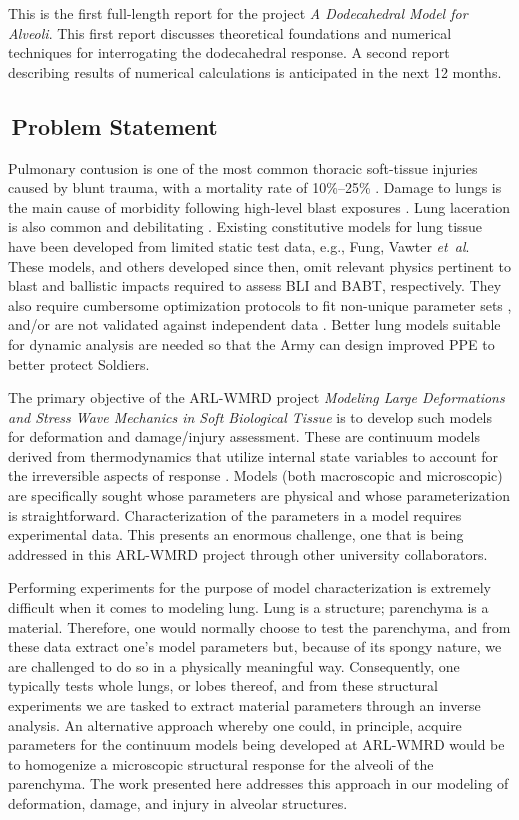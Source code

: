 This is the first full-length report for the project \textit{A Dodecahedral Model for Alveoli}.  This first report discusses theoretical foundations and numerical techniques for interrogating the dodecahedral response.  A second report describing results of numerical calculations is anticipated in the next 12 months.

\subsection{$\,$Problem Statement}

Pulmonary contusion is one of the most common thoracic soft-tissue injuries caused by blunt trauma, with a mortality rate of 10\%--25\% \cite{Stitzeletal05}.  Damage to lungs is the main cause of morbidity following high-level blast exposures \cite{Stuhmilleretal88}.  Lung laceration is also common and debilitating \cite{VlessisTrunkey97}.  Existing constitutive models for lung tissue have been developed from limited static test data, e.g., Fung, Vawter \textit{et~al}.\ \cite{Fungetal78,Vawteretal79,Vawter80} These models, and others developed since then, omit relevant physics pertinent to blast and ballistic impacts required to assess BLI and BABT, respectively.  They also require cumbersome optimization protocols to fit non-unique parameter sets \cite{Gayziketal07,Gayziketal11}, and\slash or are not validated against independent data \cite{Yuenetal08}.  Better lung models suitable for dynamic analysis are needed so that the Army can design improved PPE to better protect Soldiers.

The primary objective of the ARL-WMRD project \textit{Modeling Large Deformations and Stress Wave Mechanics in Soft Biological Tissue\/} is to develop such models for deformation and damage\slash injury assessment.  These are continuum models derived from thermo\-dynamics that utilize internal state variables to account for the irreversible aspects of response \cite{ClaytonFreed19,ClaytonFreed20}.  Models (both macro\-scopic and micro\-scopic) are specifically sought whose parameters are physical and whose parameterization is straightforward.  Characterization of the parameters in a model requires experimental data.  This presents an enormous challenge, one that is being addressed in this ARL-WMRD project through other university collaborators.  

Performing experiments for the purpose of model characterization is extremely difficult when it comes to modeling lung.  Lung is a structure; parenchyma is a material.  Therefore, one would normally choose to test the parenchyma, and from these data extract one's model parameters but, because of its spongy nature, we are challenged to do so in a physically meaningful way.  Consequently, one typically tests whole lungs, or lobes thereof, and from these structural experiments we are tasked to extract material parameters through an inverse analysis.  An alternative approach whereby one could, in principle, acquire parameters for the continuum models being developed at ARL-WMRD would be to homo\-genize a microscopic structural response for the alveoli of the parenchyma.  The work presented here addresses this approach in our modeling of deformation, damage, and injury in alveolar structures.

